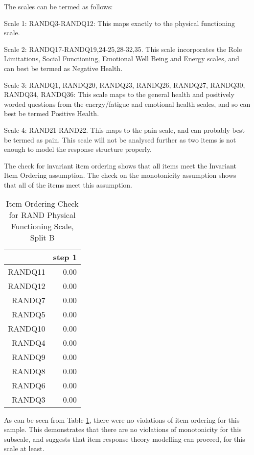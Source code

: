 \documentclass{article}
\begin{document}
The scales can be termed as follows:

Scale 1: RANDQ3-RANDQ12: This maps exactly to the physical functioning scale.

Scale 2: RANDQ17-RANDQ19,24-25,28-32,35. This scale incorporates the Role Limitations, Social Functioning, Emotional Well Being and Energy scales, and can best be termed as Negative Health.

Scale 3: RANDQ1, RANDQ20, RANDQ23, RANDQ26, RANDQ27, RANDQ30, RANDQ34, RANDQ36: This scale maps to the general health and positively worded questions from the energy/fatigue and emotional health scales, and so can best be termed Positive Health.  

Scale 4: RAND21-RAND22. This maps to the  pain scale, and can probably best be termed as pain. This scale will not be analysed further as two items is not enough to model the response structure properly. 




The check for invariant item ordering shows that all items  meet the Invariant Item Ordering  assumption. The check on the monotonicity assumption shows that all of the items meet this assumption. 


\begin{table}[ht]
\centering
\begin{tabular}{rr}
  \hline
 & step 1 \\ 
  \hline
RANDQ11 & 0.00 \\ 
  RANDQ12 & 0.00 \\ 
  RANDQ7 & 0.00 \\ 
  RANDQ5 & 0.00 \\ 
  RANDQ10 & 0.00 \\ 
  RANDQ4 & 0.00 \\ 
  RANDQ9 & 0.00 \\ 
  RANDQ8 & 0.00 \\ 
  RANDQ6 & 0.00 \\ 
  RANDQ3 & 0.00 \\ 
   \hline
\end{tabular}
\caption{Item Ordering Check for RAND Physical Functioning Scale, Split B} 
\label{tab:physfunc2bitemord}
\end{table}
As can be seen from Table \ref{tab:physfunc2bitemord}, there were no violations of item ordering for this sample.  This demonstrates that there are no violations of monotonicity for this subscale, and suggests that item response theory modelling can proceed, for this scale at least.
\end{document}

